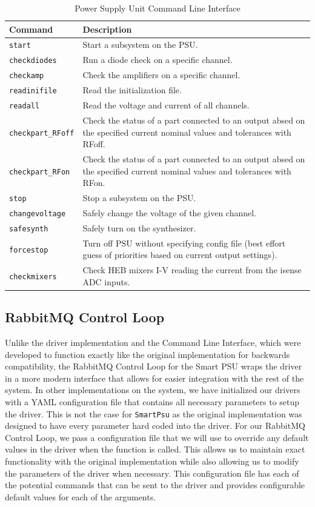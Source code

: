 \begin{table}
    \centering
    \begin{tabularx}{\textwidth}{l|X}
        \textbf{Command} & \textbf{Description} \\
        \hline
        \texttt{start} & Start a subsystem on the PSU. \\
        \texttt{checkdiodes} & Run a diode check on a specific channel. \\
        \texttt{checkamp} & Check the amplifiers on a specific channel. \\
        \texttt{readinifile} & Read the initialization file. \\
        \texttt{readall} & Read the voltage and current of all channels. \\
        \texttt{checkpart\_RFoff} & Check the status of a part connected to an output absed on the specified current nominal values and tolerances with RFoff. \\
        \texttt{checkpart\_RFon} & Check the status of a part connected to an output absed on the specified current nominal values and tolerances with RFon. \\
        \texttt{stop} & Stop a subsystem on the PSU. \\
        \texttt{changevoltage} & Safely change the voltage of the given channel. \\
        \texttt{safesynth} & Safely turn on the synthesizer. \\
        \texttt{forcestop} & Turn off PSU without specifying config file (best effort guess of priorities based on current output settings). \\
        \texttt{checkmixers} & Check HEB mixers I-V reading the current from the isense ADC inputs.
    \end{tabularx}
    \caption{Power Supply Unit Command Line Interface}
    \label{readout/table:psu_cli}
\end{table}

\subsection{RabbitMQ Control Loop}
Unlike the driver implementation and the Command Line Interface, which were developed to function exactly like the original implementation for backwards compatibility, the RabbitMQ Control Loop for the Smart PSU wraps the driver in a more modern interface that allows for easier integration with the rest of the system.
In other implementations on the system, we have initialized our drivers with a YAML configuration file that contains all necessary parameters to setup the driver. 
This is not the case for \texttt{SmartPsu} as the original implementation was designed to have every parameter hard coded into the driver.
For our RabbitMQ Control Loop, we pass a configuration file that we will use to override any default values in the driver when the function is called. 
This allows us to maintain exact functionality with the original implementation while also allowing us to modify the parameters of the driver when necessary.
This configuration file has each of the potential commands that can be sent to the driver and provides configurable default values for each of the arguments.

